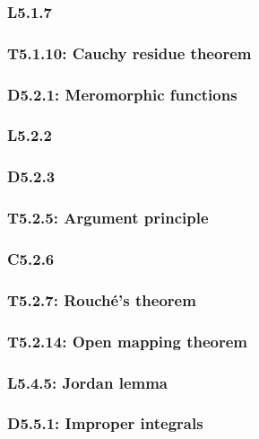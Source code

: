 \documentclass{article}
\begin{document}
\begin{multicols*}{3}
\subsubsection*{L5.1.7}

\subsubsection*{T5.1.10: Cauchy residue theorem}

\newcolumn

\subsubsection*{D5.2.1: Meromorphic functions}

\subsubsection*{L5.2.2}

\subsubsection*{D5.2.3}

\subsubsection*{T5.2.5: Argument principle}

\subsubsection*{C5.2.6}

\subsubsection*{T5.2.7: Rouch\'e's theorem}

\subsubsection*{T5.2.14: Open mapping theorem}

\newcolumn

\subsubsection*{L5.4.5: Jordan lemma}

\newcolumn

\subsubsection*{D5.5.1: Improper integrals}

\end{multicols*}
\end{document}

